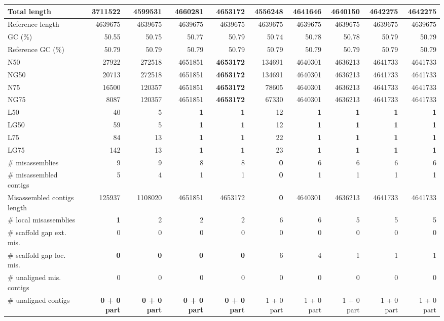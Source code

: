 \documentclass[12pt,a4paper]{article}
\begin{document}
\begin{table}[ht]
\begin{center}
\begin{tabular}{|l*{9}{|r}|}
Total length & 3711522 & 4599531 & {\bf 4660281} & 4653172 & 4556248 & 4641646 & 4640150 & 4642275 & 4642275 \\ \hline
Reference length & 4639675 & 4639675 & 4639675 & 4639675 & 4639675 & 4639675 & 4639675 & 4639675 & 4639675 \\ \hline
GC (\%) & 50.55 & 50.75 & 50.77 & 50.79 & 50.74 & 50.78 & 50.78 & 50.79 & 50.79 \\ \hline
Reference GC (\%) & 50.79 & 50.79 & 50.79 & 50.79 & 50.79 & 50.79 & 50.79 & 50.79 & 50.79 \\ \hline
N50 & 27922 & 272518 & 4651851 & {\bf 4653172} & 134691 & 4640301 & 4636213 & 4641733 & 4641733 \\ \hline
NG50 & 20713 & 272518 & 4651851 & {\bf 4653172} & 134691 & 4640301 & 4636213 & 4641733 & 4641733 \\ \hline
N75 & 16500 & 120357 & 4651851 & {\bf 4653172} & 78605 & 4640301 & 4636213 & 4641733 & 4641733 \\ \hline
NG75 & 8087 & 120357 & 4651851 & {\bf 4653172} & 67330 & 4640301 & 4636213 & 4641733 & 4641733 \\ \hline
L50 & 40 & 5 & {\bf 1} & {\bf 1} & 12 & {\bf 1} & {\bf 1} & {\bf 1} & {\bf 1} \\ \hline
LG50 & 59 & 5 & {\bf 1} & {\bf 1} & 12 & {\bf 1} & {\bf 1} & {\bf 1} & {\bf 1} \\ \hline
L75 & 84 & 13 & {\bf 1} & {\bf 1} & 22 & {\bf 1} & {\bf 1} & {\bf 1} & {\bf 1} \\ \hline
LG75 & 142 & 13 & {\bf 1} & {\bf 1} & 23 & {\bf 1} & {\bf 1} & {\bf 1} & {\bf 1} \\ \hline
\# misassemblies & 9 & 9 & 8 & 8 & {\bf 0} & 6 & 6 & 6 & 6 \\ \hline
\# misassembled contigs & 5 & 4 & 1 & 1 & {\bf 0} & 1 & 1 & 1 & 1 \\ \hline
Misassembled contigs length & 125937 & 1108020 & 4651851 & 4653172 & {\bf 0} & 4640301 & 4636213 & 4641733 & 4641733 \\ \hline
\# local misassemblies & {\bf 1} & 2 & 2 & 2 & 6 & 6 & 5 & 5 & 5 \\ \hline
\# scaffold gap ext. mis. & 0 & 0 & 0 & 0 & 0 & 0 & 0 & 0 & 0 \\ \hline
\# scaffold gap loc. mis. & {\bf 0} & {\bf 0} & {\bf 0} & {\bf 0} & 6 & 4 & 1 & 1 & 1 \\ \hline
\# unaligned mis. contigs & 0 & 0 & 0 & 0 & 0 & 0 & 0 & 0 & 0 \\ \hline
\# unaligned contigs & {\bf 0 + 0 part} & {\bf 0 + 0 part} & {\bf 0 + 0 part} & {\bf 0 + 0 part} & 1 + 0 part & 1 + 0 part & 1 + 0 part & 1 + 0 part & 1 + 0 part \\ \hline

\end{tabular}
\end{center}
\end{table}
\end{document}
